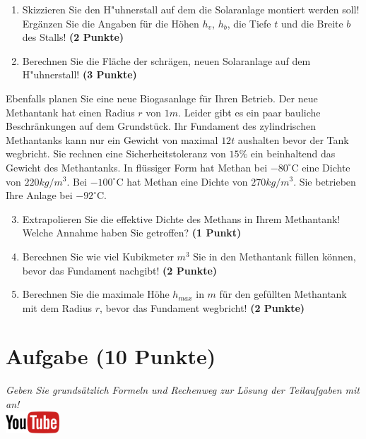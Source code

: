 \documentclass[a4paper, 9pt]{scrartcl}\usepackage[]{graphicx}\usepackage[]{xcolor}
\begin{document}
\begin{enumerate}
\item Skizzieren Sie den H{"u}hnerstall auf dem die Solaranlage montiert
  werden soll! Erg{\"a}nzen Sie die Angaben f{\"u}r die H{\"o}hen $h_v$, $h_b$, die
  Tiefe $t$ und die Breite $b$ des Stalls!  \textbf{(2 Punkte)}
\item Berechnen Sie die Fl{\"a}che der schr{\"a}gen, neuen Solaranlage auf dem
  H{"u}hnerstall! \textbf{(3 Punkte)}
\end{enumerate}

Ebenfalls planen Sie eine neue Biogasanlage f{\"u}r Ihren Betrieb. Der neue
Methantank hat einen Radius $r$ von $1m$. Leider gibt es ein
paar bauliche Beschr{\"a}nkungen auf dem Grundst{\"u}ck. Ihr Fundament des
zylindrischen Methantanks kann nur ein Gewicht von maximal
$12t$ aushalten bevor der Tank wegbricht. Sie rechnen eine
Sicherheitstoleranz von $15\%$ ein beinhaltend das Gewicht des
Methantanks. In fl{\"u}ssiger Form hat
Methan bei $-80^\circ\text{C}$ eine Dichte von
$220kg/m^3$. Bei $-100^\circ\text{C}$ hat Methan eine Dichte
von $270kg/m^3$. Sie betrieben Ihre Anlage bei
$-92^\circ\text{C}$.

\begin{enumerate}
  \setcounter{enumi}{2}
\item Extrapolieren Sie die effektive Dichte des Methans in Ihrem
  Methantank! Welche Annahme haben Sie getroffen? \textbf{(1 Punkt)}
\item Berechnen Sie wie viel Kubikmeter $m^3$ Sie in den Methantank f{\"u}llen
  k{\"o}nnen, bevor das Fundament nachgibt! \textbf{(2 Punkte)}
\item Berechnen Sie die maximale H{\"o}he $h_{max}$ in $m$ f{\"u}r den gef{\"u}llten
  Methantank mit dem Radius $r$, bevor das Fundament wegbricht! \textbf{(2
    Punkte)}
\end{enumerate}

 
\clearpage

\section{Aufgabe \hfill (10 Punkte)}

\textit{Geben Sie grunds{\"a}tzlich Formeln und Rechenweg zur L{\"o}sung der
  Teilaufgaben mit an!} \\[1Ex]

\hfill\href{https://youtu.be/https://youtu.be/k2G52hMIfqk}{\includegraphics[width = 2cm]{img/youtube}} %
\hspace{2Ex}
\end{document}
